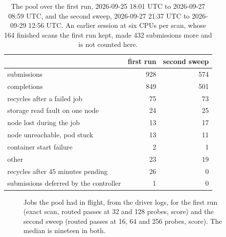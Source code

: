 \documentclass[sigconf, nonacm]{acmart}
\begin{document}
\begin{table}[t]
\caption{The pool over the first run, 2026-09-25 18:01 UTC to 2026-09-27 08:59 UTC, and the second
sweep, 2026-09-27 21:37 UTC to 2026-09-29 12:56 UTC. An earlier session at six CPUs per scan, whose 164
finished scans the first run kept, made 432 submissions more and is not counted here.}
\label{tab:pool}
\centering
\small
\begin{tabular}{lrr}
\toprule
 & first run & second sweep \\
\midrule
submissions & 928 & 574 \\
completions & 849 & 501 \\
recycles after a failed job & 75 & 73 \\
\quad storage read fault on one node & 24 & 25 \\
\quad node lost during the job & 13 & 17 \\
\quad node unreachable, pod stuck & 13 & 11 \\
\quad container start failure & 2 & 1 \\
\quad other & 23 & 19 \\
recycles after 45 minutes pending & 26 & 0 \\
submissions deferred by the controller & 1 & 0 \\
\bottomrule
\end{tabular}
\end{table}

\begin{figure}[t]
\centering
{}
\caption{Jobs the pool had in flight, from the driver logs, for the first run (exact scan, routed
passes at 32 and 128 probes, score) and the second sweep (routed passes at 16, 64 and 256
probes, score). The median is nineteen in both.}
\label{fig:inflight}
\end{figure}
\end{document}
